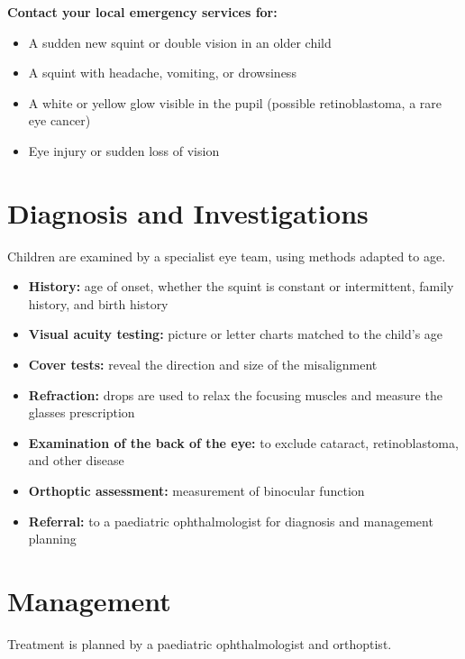\textbf{Contact your local emergency services for:}
\begin{itemize}
    \item A sudden new squint or double vision in an older child
    \item A squint with headache, vomiting, or drowsiness
    \item A white or yellow glow visible in the pupil (possible retinoblastoma, a rare eye cancer)
    \item Eye injury or sudden loss of vision
\end{itemize}

\section*{Diagnosis and Investigations}
Children are examined by a specialist eye team, using methods adapted to age.

\begin{itemize}
    \item \textbf{History:} age of onset, whether the squint is constant or intermittent, family history, and birth history
    \item \textbf{Visual acuity testing:} picture or letter charts matched to the child's age
    \item \textbf{Cover tests:} reveal the direction and size of the misalignment
    \item \textbf{Refraction:} drops are used to relax the focusing muscles and measure the glasses prescription
    \item \textbf{Examination of the back of the eye:} to exclude cataract, retinoblastoma, and other disease
    \item \textbf{Orthoptic assessment:} measurement of binocular function
    \item \textbf{Referral:} to a paediatric ophthalmologist for diagnosis and management planning
\end{itemize}

\section*{Management}
Treatment is planned by a paediatric ophthalmologist and orthoptist.

